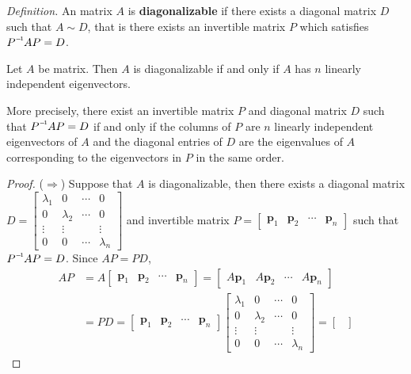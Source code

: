 \textit{Definition.} An \nbyn matrix $A$ is \textbf{diagonalizable} if there exists a diagonal \nbyn matrix $D$ such that $A \sim D$, that is there exists an invertible \nbyn matrix $P$ which satisfies $\inv{P}AP = D$.

\begin{theorem}
	Let $ A $ be \nbyn matrix. Then $ A $ is diagonalizable if and only if $ A $ has $ n $ linearly independent eigenvectors. 
	
	More precisely, there exist an invertible matrix $ P $ and diagonal matrix $ D $ such that $ \inv{P}AP=D $ if and only if the columns of $ P $ are $ n $ linearly independent eigenvectors of $ A $ and the diagonal entries of $ D $ are the eigenvalues of $ A $ corresponding to the eigenvectors in $ P $ in the same order.
\end{theorem}
\begin{proof}
	($\Rightarrow$) Suppose that $A$ is diagonalizable, then there exists a diagonal matrix $D = \begin{bmatrix}
		\lambda_1 & 0 & \cdots & 0 \\
		0 & \lambda_2 & \cdots & 0 \\
		\vdots & \vdots & & \vdots \\
		0 & 0 & \cdots & \lambda_n
	\end{bmatrix}$ and invertible matrix $P = \begin{bmatrix}
		\textbf{p}_1 & \textbf{p}_2 & \cdots & \textbf{p}_n
	\end{bmatrix}$ such that $\inv{P}AP = D$.
	Since $AP = PD$, \begin{align*}
		AP &= A\begin{bmatrix}
			\textbf{p}_1 & \textbf{p}_2 & \cdots & \textbf{p}_n
		\end{bmatrix} = \begin{bmatrix}
			A\textbf{p}_1 & A\textbf{p}_2 & \cdots & A\textbf{p}_n
		\end{bmatrix} \\
		&= PD = \begin{bmatrix}
			\textbf{p}_1 & \textbf{p}_2 & \cdots & \textbf{p}_n
		\end{bmatrix}\begin{bmatrix}
			\lambda_1 & 0 & \cdots & 0 \\
			0 & \lambda_2 & \cdots & 0 \\
			\vdots & \vdots & & \vdots \\
			0 & 0 & \cdots & \lambda_n
		\end{bmatrix} = \begin{bmatrix}

\end{bmatrix}
\end{align*}
\end{proof}
